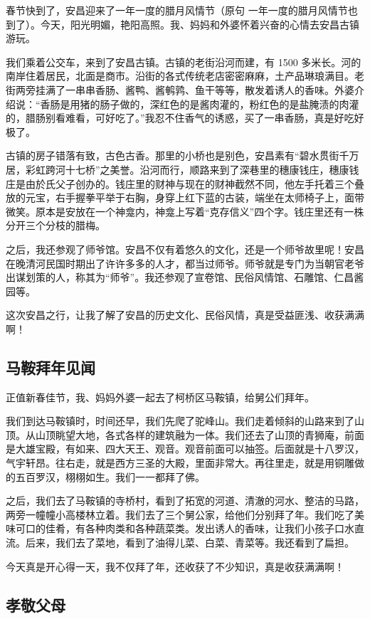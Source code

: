 \documentclass[UTF8,a4paper,titlepage,twoside,10.5pt]{article}
\begin{document}
春节快到了，安昌迎来了一年一度的腊月风情节（原句 一年一度的腊月风情节也到了）。今天，阳光明媚，艳阳高照。我、妈妈和外婆怀着兴奋的心情去安昌古镇游玩。

我们乘着公交车，来到了安昌古镇。古镇的老街沿河而建，有 1500 多米长。河的南岸住着居民，北面是商市。沿街的各式传统老店密密麻麻，土产品琳琅满目。老街两旁挂满了一串串香肠、酱鸭、酱鹌鹑、鱼干等等，散发着诱人的香味。外婆介绍说：“香肠是用猪的肠子做的，深红色的是酱肉灌的，粉红色的是盐腌渍的肉灌的，腊肠别看难看，可好吃了。”我忍不住香气的诱惑，买了一串香肠，真是好吃好极了。

古镇的房子错落有致，古色古香。那里的小桥也是别色，安昌素有“碧水贯街千万居，彩虹跨河十七桥”之美誉。沿河而行，顺路来到了深巷里的穗康钱庄，穗康钱庄是由於氏父子创办的。钱庄里的财神与现在的财神截然不同，他左手托着三个叠放的元宝，右手握拳平举于右胸，身穿上红下蓝的古装，端坐在太师椅子上，面带微笑。原本是安放在一个神龛内，神龛上写着“克存信义”四个字。钱庄里还有一株分开三个分枝的腊梅。

之后，我还参观了师爷馆。安昌不仅有着悠久的文化，还是一个师爷故里呢！安昌在晚清河民国时期出了许许多多的人才，都当过师爷。师爷就是专门为当朝官老爷出谋划策的人，称其为“师爷”。我还参观了宣卷馆、民俗风情馆、石雕馆、仁昌酱园等。

这次安昌之行，让我了解了安昌的历史文化、民俗风情，真是受益匪浅、收获满满啊！

\subsection{马鞍拜年见闻}
\label{sec:org238f191}

正值新春佳节，我、妈妈外婆一起去了柯桥区马鞍镇，给舅公们拜年。

我们到达马鞍镇时，时间还早，我们先爬了驼峰山。我们走着倾斜的山路来到了山顶。从山顶眺望大地，各式各样的建筑融为一体。我们还去了山顶的青狮庵，前面是大雄宝殿，有如来、四大天王、观音。观音前面可以抽签。后面就是十八罗汉，气宇轩昂。往右走，就是西方三圣的大殿，里面非常大。再往里走，就是用铜雕做的五百罗汉，栩栩如生。我们一一都拜了佛。

之后，我们去了马鞍镇的寺桥村，看到了拓宽的河道、清澈的河水、整洁的马路，两旁一幢幢小高楼林立着。我们去了三个舅公家，给他们分别拜了年。我们吃了美味可口的佳肴，有各种肉类和各种蔬菜类。发出诱人的香味，让我们小孩子口水直流。后来，我们去了菜地，看到了油得儿菜、白菜、青菜等。我还看到了扁担。

今天真是开心得一天，我不仅拜了年，还收获了不少知识，真是收获满满啊！

\subsection{孝敬父母}
\label{sec:orgc24380c}
\end{document}
